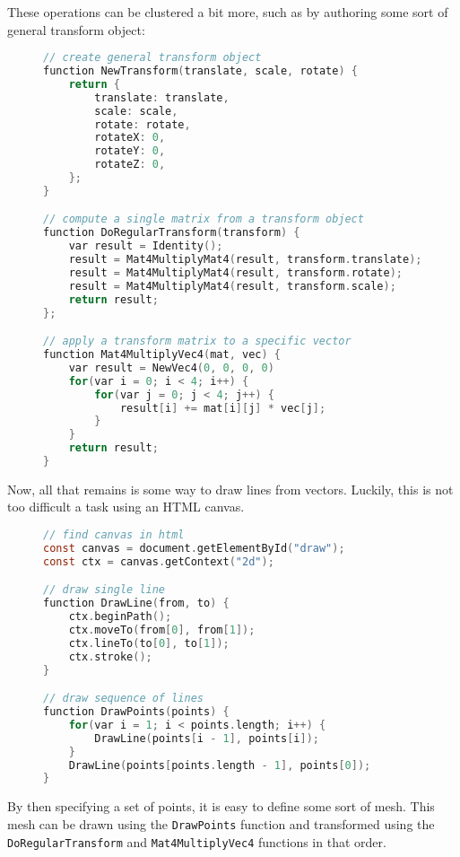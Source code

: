 These operations can be clustered a bit more, such as by authoring some sort of general transform object:

\begin{figure}[H]
	\begin{center}
		\begin{lstlisting}[language=C]
// create general transform object
function NewTransform(translate, scale, rotate) {
	return {
		translate: translate,
		scale: scale,
		rotate: rotate,
		rotateX: 0,
		rotateY: 0,
		rotateZ: 0,
	};
}

// compute a single matrix from a transform object
function DoRegularTransform(transform) {
	var result = Identity();
	result = Mat4MultiplyMat4(result, transform.translate);
	result = Mat4MultiplyMat4(result, transform.rotate);
	result = Mat4MultiplyMat4(result, transform.scale);
	return result;
};

// apply a transform matrix to a specific vector
function Mat4MultiplyVec4(mat, vec) {
	var result = NewVec4(0, 0, 0, 0)
	for(var i = 0; i < 4; i++) {
		for(var j = 0; j < 4; j++) {
			result[i] += mat[i][j] * vec[j];
		}
	}
	return result;
}
		\end{lstlisting}
	\end{center}
\end{figure}

Now, all that remains is some way to draw lines from vectors. Luckily, this is not too difficult a task using an HTML canvas.

\begin{figure}[H]
	\begin{center}
		\begin{lstlisting}[language=C]
// find canvas in html
const canvas = document.getElementById("draw");
const ctx = canvas.getContext("2d");

// draw single line
function DrawLine(from, to) {
	ctx.beginPath();
	ctx.moveTo(from[0], from[1]);
	ctx.lineTo(to[0], to[1]);
	ctx.stroke();
}

// draw sequence of lines
function DrawPoints(points) {
	for(var i = 1; i < points.length; i++) {
		DrawLine(points[i - 1], points[i]);
	}
	DrawLine(points[points.length - 1], points[0]);
}
		\end{lstlisting}
	\end{center}
\end{figure}

By then specifying a set of points, it is easy to define some sort of mesh. This mesh can be drawn using the \lstinline{DrawPoints} function and transformed using the \lstinline{DoRegularTransform} and \lstinline{Mat4MultiplyVec4} functions in that order.

